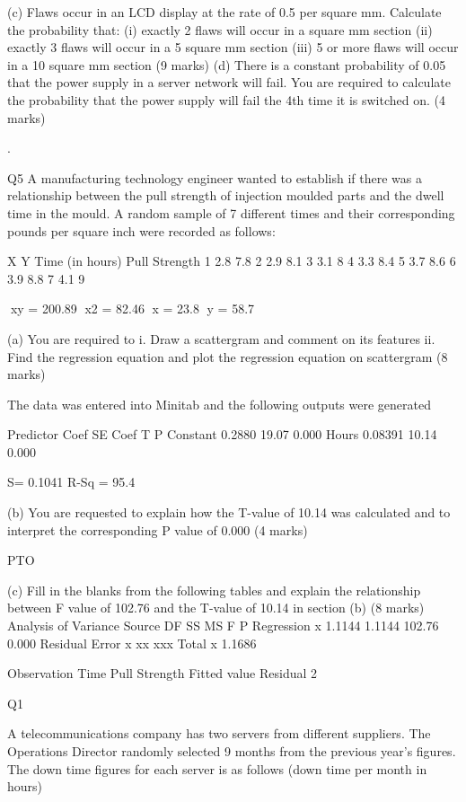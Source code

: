 (c)	Flaws occur in an LCD display at the rate of 0.5 per square mm.  Calculate the probability that:
(i)	exactly 2 flaws will occur in a square mm section
(ii)	exactly 3 flaws will occur in a 5 square mm section
(iii)	5 or more flaws will occur in a 10 square mm section
(9 marks)
(d)	There is a constant probability of 0.05 that the power supply in a server network will fail.  You are required to calculate the probability that the power supply will fail the 4th time it is switched on.
(4 marks)

.




Q5
A manufacturing technology engineer wanted to establish if there was a relationship between the pull strength of injection moulded parts and the dwell time in the mould. A random sample of 7 different times and their corresponding pounds per square inch were recorded as follows:


	X	Y
	Time (in hours)	Pull Strength
1	2.8	7.8
2	2.9	8.1
3	3.1	8
4	3.3	8.4
5	3.7	8.6
6	3.9	8.8
7	4.1	9
	
	xy =	200.89	 x2 = 	82.46	 x = 23.8	y = 58.7

(a) 	You are required to 
i.	Draw a scattergram and comment on its features
ii.	Find the regression equation and plot the regression equation on scattergram
(8 marks)

The data was entered into Minitab and the following outputs were generated

Predictor	Coef		SE Coef	T		P
Constant			0.2880		19.07		0.000
Hours				0.08391	10.14		0.000

S= 0.1041	R-Sq = 95.4%


(b) 	You are requested to explain how the T-value of 10.14 was calculated and to 
interpret the corresponding P value of 0.000
										(4 marks)

											PTO
 

(c)	Fill in the blanks from the following tables and explain the relationship between F value of 102.76 and the T-value of 10.14 in section (b)
										(8 marks)
Analysis of Variance
Source			DF		SS		MS		F		P
Regression		x		1.1144		1.1144		102.76		0.000
Residual Error		x		xx		xxx		
Total			x		1.1686



Observation		Time		Pull Strength		Fitted value	Residual
2		


Q1

A telecommunications company has two servers from different suppliers. The Operations Director randomly selected 9 months from the previous year’s figures.  The down time figures for each server is as follows (down time per month in hours)


